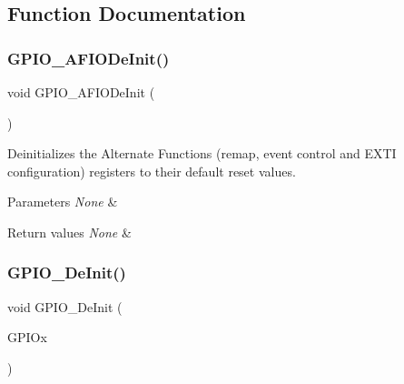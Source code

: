 \subsection{Function Documentation}
\mbox{\label{group___g_p_i_o___private___functions_ga7f645e6b6146818c3d6c19021e70170c}} 
\subsubsection{\texorpdfstring{GPIO\_AFIODeInit()}{GPIO\_AFIODeInit()}}
{\footnotesize\ttfamily void G\+P\+I\+O\+\_\+\+A\+F\+I\+O\+De\+Init (\begin{DoxyParamCaption}\item[{void}]{ }\end{DoxyParamCaption})}



Deinitializes the Alternate Functions (remap, event control and E\+X\+TI configuration) registers to their default reset values. 


\begin{DoxyParams}{Parameters}
{\em None} & \\
\hline
\end{DoxyParams}

\begin{DoxyRetVals}{Return values}
{\em None} & \\
\hline
\end{DoxyRetVals}
\mbox{\label{group___g_p_i_o___private___functions_gaa60bdf3182c44b5fa818f237042f52ee}} 
\subsubsection{\texorpdfstring{GPIO\_DeInit()}{GPIO\_DeInit()}}
{\footnotesize\ttfamily void G\+P\+I\+O\+\_\+\+De\+Init (\begin{DoxyParamCaption}\item[{\mbox{\hyperlink{struct_g_p_i_o___type_def}{G\+P\+I\+O\+\_\+\+Type\+Def}} $\ast$}]{G\+P\+I\+Ox }\end{DoxyParamCaption})}



